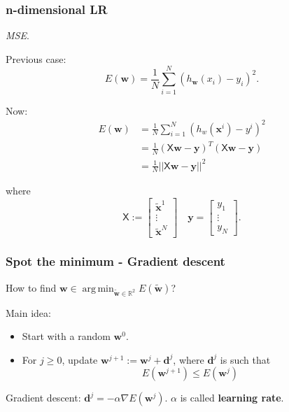 \documentclass{beamer}
\DeclareMathOperator*{\argmin}{arg\,min}
\begin{document}
	\begin{frame}
		\frametitle{n-dimensional LR}
		\textsl{MSE}.
		
		Previous case: 
		\begin{equation*}
			E(\bm{w}) = \frac{1}{N} \sum_{i=1}^{N} (h_{\bm{w}}(x_i) - y_i)^2.
		\end{equation*}
		
		\vspace{1 mm}
		
		Now: 
		\begin{align*}
			E(\bm{w}) &= \frac{1}{N} \sum_{i=1}^{N} (h_w(\bm{x}^i) - y^i)^2\\
			&= \frac{1}{N} (\mathsf{X} \bm{w} - \bm{y})^T (\mathsf{X}\bm{w} - \bm{y})\\
			&= \frac{1}{N} ||\mathsf{X}\bm{w} - \bm{y}||^2
		\end{align*}
		
		where
		\begin{equation*}
			\mathsf{X} := \begin{bmatrix}
				\tilde{\bm{x}}^1\\
				\vdots\\
				\tilde{\bm{x}}^N 
			\end{bmatrix} \quad \bm{y} = \begin{bmatrix}
			y_1 \\
			\vdots\\
			y_N
		\end{bmatrix}.
		\end{equation*}
	\end{frame}

	\begin{frame}
		\frametitle{Spot the minimum - Gradient descent}
		How to find $\bm{w} \in \argmin_{\tilde{\bm{w}} \in \mathbb{R}^2} E(\tilde{\bm{w}})$?
		
		Main idea:
		\begin{itemize}
			\item Start with a random $\bm{w}^0$.
			\item For $j \geq 0$, update $\bm{w}^{j+1} := \bm{w}^{j} + \bm{d}^j$, where $\bm{d}^j$ is such that
			\begin{equation*}
				E(\bm{w}^{j+1}) \leq E(\bm{w}^j) 
			\end{equation*}
		\end{itemize}
		Gradient descent: $\bm{d}^j = - \alpha \nabla E(\bm{w}^j)$. $\alpha$ is called \textbf{learning rate}.
	\end{frame}
\end{document}
